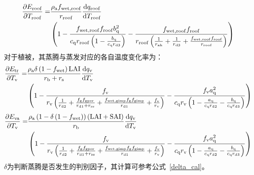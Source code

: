%
\begin{equation}
  \begin{split}
    \frac{\partial  E_{\mathrm{roof}}}{\partial T_{\mathrm{roof}}} = &\frac{\rho _{\rm a} f_{\mathrm{wet,roof}}}{r_{\mathrm{roof}}} \frac{{\mathrm {d}} q_{\mathrm{roof}}}{{\mathrm {d}} T_{\mathrm{roof}}} \\
    & \left(1-\frac{f_{\mathrm{wet,roof}}f_{\mathrm{roof}} b_{\mathrm{q}}^2}{c_{\mathrm{q}} r_{\mathrm{roof}} \left(1-\frac{b_{\mathrm{q}}}{c_{\mathrm{q}} r_{\mathrm{d3}}}\right)}-\frac{f_{\mathrm{wet,roof}}f_{\mathrm{roof}}}{r_{\mathrm{roof}}\left(\frac{1}{r_{\mathrm{ah}}}+\frac{1}{r_{\mathrm{d3}}}+\frac{f_{\mathrm{wet,roof}} f_{\mathrm{roof}}}{r_{\mathrm{roof}}}\right)}\right)
  \end{split}
\end{equation}
对于植被，其蒸腾与蒸发对应的各自温度变化率为：
%
\begin{equation}
  \begin{split}
    \frac{\partial  E_{\mathrm{tr}}}{\partial T_{\mathrm{v}}} = &\frac{\rho _{\rm a} \delta \left(1-f_{\mathrm{wet}}\right) {\rm LAI}} {r_{\mathrm{b}}+r_{\mathrm{s}}} \frac{{\mathrm {d}} q_{\mathrm{v}}}{{\mathrm {d}} T_{\mathrm{v}}} \\
    &\left(1-\frac{f_{\mathrm{v}}}{r_{\mathrm{v}}\left(\frac{1}{r_{\mathrm{d2}}} + \frac{f_{\mathrm{g}} f_{\mathrm{gper}}}{r_{\mathrm{d1}} + r_{\mathrm{ss}}} + \frac{f_{\mathrm{wet,gimp}} f_{\mathrm{g}} f_{\mathrm{gimp}}}{r_{\mathrm{d1}}}+\frac{f_{\rm v}}{r_{\mathrm{v}}}\right)} - \frac{f_{\mathrm{v}} a_{\mathrm{q}}^2}{c_{\mathrm{q}} r_{\mathrm{v}} \left( 1 - \frac{a_{\mathrm{q}}}{c_{\mathrm{q}} r_{\mathrm{d2}}} - \frac{b_{\mathrm{q}}}{c_{\mathrm{q}} r_{\mathrm{d3}}} \right)}\right)
  \end{split}
\end{equation}
%
\begin{equation}
  \begin{split}
    \frac{\partial  E_{\mathrm{va}}}{\partial T_{\mathrm{v}}} = &\frac{\rho _{\rm a} \left(1-\delta\left(1-f_{\mathrm{wet}}\right)\right)\left({\rm LAI}+{\rm SAI}\right)}{r_{\mathrm{b}}} \frac{{\mathrm {d}} q_{\mathrm{v}}}{{\mathrm {d}} T_{\mathrm{v}}} \\
    &\left(1-\frac{f_{\mathrm{v}}}{r_{\mathrm{v}}\left(\frac{1}{r_{\mathrm{d2}}} + \frac{f_{\mathrm{g}} f_{\mathrm{gper}}}{r_{\mathrm{d1}} + r_{\mathrm{ss}}} + \frac{f_{\mathrm{wet,gimp}} f_{\mathrm{g}} f_{\mathrm{gimp}}}{r_{\mathrm{d1}}}+\frac{f_{\rm v}}{r_{\mathrm{v}}}\right)} - \frac{f_{\mathrm{v}} a_{\mathrm{q}}^2}{c_{\mathrm{q}} r_{\mathrm{v}} \left( 1 - \frac{a_{\mathrm{q}}}{c_{\mathrm{q}} r_{\mathrm{d2}}} - \frac{b_{\mathrm{q}}}{c_{\mathrm{q}} r_{\mathrm{d3}}} \right)}\right)
  \end{split}
\end{equation}
$\delta$为判断蒸腾是否发生的判别因子，其计算可参考公式~\eqref{delta_cal}。

